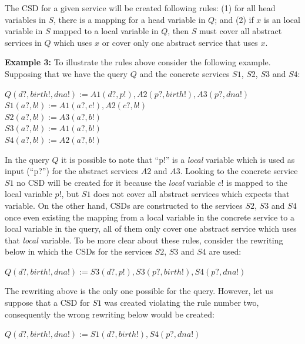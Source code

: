 \documentclass[12pt,a4paper,oneside]{article}
\begin{document}
The CSD for a given service will be created following rules: (1) for all head variables in $S$, there is a mapping for a head variable in $Q$; and (2) if $x$ is an local variable in $S$ mapped to a local variable in $Q$, then $S$ must cover all abstract services in $Q$ which uses $x$ or cover only one abstract service that uses $x$.

\noindent \textbf{Example 3:} To illustrate the rules above consider the following example. Supposing that we have the query $Q$ and the concrete services $S1$, $S2$, $S3$ and $S4$:

\begin{center}
$Q (d?, birth!, dna!) := A1(d?, p!), A2(p?, birth!), A3(p?, dna!)$ \\
$S1 (a?, b!) := A1(a?, c!), A2(c?, b!)$ \\
$S2 (a?, b!) := A3(a?, b!)$ \\
$S3 (a?, b!) := A1(a?, b!)$ \\
$S4 (a?, b!) := A2(a?, b!)$ \\
\end{center} 

In the query $Q$ it is possible to note that ``p!'' is a \textit{local} variable which is used as input (``p?'') for the abstract services $A2$ and $A3$. 
Looking to the concrete service $S1$ no CSD will be created for it because the \textit{local} variable $c!$ is mapped to the local variable $p!$, but $S1$ does not cover all abstract services which expects that variable. 
On the other hand, CSDs are constructed to the services $S2$, $S3$ and $S4$ once even existing the mapping from a local variable in the concrete service to a local variable in the query, all of them only cover one abstract service which uses that \textit{local} variable.
To be more clear about these rules, consider the rewriting below in which the CSDs for the services  $S2$, $S3$ and $S4$ are used:

\begin{center}
$Q (d?, birth!, dna!) := S3(d?, p!), S3(p?, birth!), S4(p?, dna!)$ \\
\end{center}  

The rewriting above is the only one possible for the query. 
However, let us suppose that a CSD for $S1$ was created violating the rule number two, consequently the wrong rewriting below would be created:

\begin{center}
$Q (d?, birth!, dna!) := S1(d?, birth!),S4(p?, dna!)$ \\
\end{center}  
\end{document}
